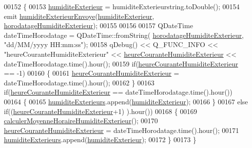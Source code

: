 \begin{DoxyCode}
00152 \{
00153     \hyperlink{class_infos_humidite_a503a9c849508928d3046292f17f37230}{humiditeExterieur} = humiditeExterieurstring.toDouble();
00154     emit \hyperlink{class_infos_humidite_a666d4bd12639460ea0fd2a3f483c2842}{humiditeExterieurEnvoye}(\hyperlink{class_infos_humidite_a503a9c849508928d3046292f17f37230}{humiditeExterieur},
      \hyperlink{class_infos_humidite_aa08b4f342e83f8ad437a8272698bb512}{horodatageHumiditeExterieur});
00155 
00156 
00157     QDateTime dateTimeHorodatage = QDateTime::fromString(
      \hyperlink{class_infos_humidite_aa08b4f342e83f8ad437a8272698bb512}{horodatageHumiditeExterieur}, \textcolor{stringliteral}{"dd/MM/yyyy HH:mm:ss"});
00158     qDebug() << Q\_FUNC\_INFO << \textcolor{stringliteral}{"heureCouranteHumiditeExterieur"} << 
      \hyperlink{class_infos_humidite_ad7b450373a47ec831872872e0e5674ad}{heureCouranteHumiditeExterieur} << dateTimeHorodatage.time().hour();
00159     \textcolor{keywordflow}{if}(\hyperlink{class_infos_humidite_ad7b450373a47ec831872872e0e5674ad}{heureCouranteHumiditeExterieur} == -1)
00160     \{
00161         \hyperlink{class_infos_humidite_ad7b450373a47ec831872872e0e5674ad}{heureCouranteHumiditeExterieur} = dateTimeHorodatage.time().hour();
00162     \}
00163     \textcolor{keywordflow}{if}(\hyperlink{class_infos_humidite_ad7b450373a47ec831872872e0e5674ad}{heureCouranteHumiditeExterieur} == dateTimeHorodatage.time().hour())
00164     \{
00165         \hyperlink{class_infos_humidite_a62d1331116ee1cf00cb8fa369a214c62}{humiditeExterieurs}.append(\hyperlink{class_infos_humidite_a503a9c849508928d3046292f17f37230}{humiditeExterieur});
00166     \}
00167     \textcolor{keywordflow}{else} \textcolor{keywordflow}{if}((\hyperlink{class_infos_humidite_ad7b450373a47ec831872872e0e5674ad}{heureCouranteHumiditeExterieur}+1)%
      ).hour())
00168     \{
00169         \hyperlink{class_infos_humidite_afc4f6ba3cd4664118ef40f4c12b76506}{calculerMoyenneHoraireHumiditeExterieur}();
00170         \hyperlink{class_infos_humidite_ad7b450373a47ec831872872e0e5674ad}{heureCouranteHumiditeExterieur} = dateTimeHorodatage.time().hour();
00171         \hyperlink{class_infos_humidite_a62d1331116ee1cf00cb8fa369a214c62}{humiditeExterieurs}.append(\hyperlink{class_infos_humidite_a503a9c849508928d3046292f17f37230}{humiditeExterieur});
00172     \}
00173 \}
\end{DoxyCode}
\mbox{\label{class_infos_humidite_a0995d68a036f73df3b5a86e5538104bd}} 
